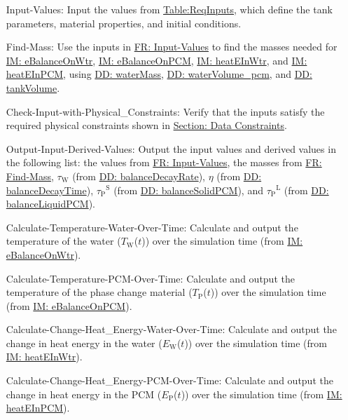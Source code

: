 \documentclass[12pt]{article}
\begin{document}
\begin{itemize}
\item[Input-Values:\phantomsection\label{inputValues}]{Input the values from \hyperref[Table:ReqInputs]{Table:ReqInputs}, which define the tank parameters, material properties, and initial conditions.}
\item[Find-Mass:\phantomsection\label{findMass}]{Use the inputs in \hyperref[inputValues]{FR: Input-Values} to find the masses needed for \hyperref[IM:eBalanceOnWtr]{IM: eBalanceOnWtr}, \hyperref[IM:eBalanceOnPCM]{IM: eBalanceOnPCM}, \hyperref[IM:heatEInWtr]{IM: heatEInWtr}, and \hyperref[IM:heatEInPCM]{IM: heatEInPCM}, using \hyperref[DD:waterMass]{DD: waterMass}, \hyperref[DD:waterVolume.pcm]{DD: waterVolume\_pcm}, and \hyperref[DD:tankVolume]{DD: tankVolume}.}
\item[Check-Input-with-Physical\_Constraints:\phantomsection\label{checkWithPhysConsts}]{Verify that the inputs satisfy the required physical constraints shown in \hyperref[Sec:DataConstraints]{Section: Data Constraints}.}
\item[Output-Input-Derived-Values:\phantomsection\label{outputInputDerivVals}]{Output the input values and derived values in the following list: the values from \hyperref[inputValues]{FR: Input-Values}, the masses from \hyperref[findMass]{FR: Find-Mass}, ${τ_{\text{W}}}$ (from \hyperref[DD:balanceDecayRate]{DD: balanceDecayRate}), $η$ (from \hyperref[DD:balanceDecayTime]{DD: balanceDecayTime}), ${{τ_{\text{P}}}^{\text{S}}}$ (from \hyperref[DD:balanceSolidPCM]{DD: balanceSolidPCM}), and ${{τ_{\text{P}}}^{\text{L}}}$ (from \hyperref[DD:balanceLiquidPCM]{DD: balanceLiquidPCM}).}
\item[Calculate-Temperature-Water-Over-Time:\phantomsection\label{calcTempWtrOverTime}]{Calculate and output the temperature of the water (${T_{\text{W}}}$($t$)) over the simulation time (from \hyperref[IM:eBalanceOnWtr]{IM: eBalanceOnWtr}).}
\item[Calculate-Temperature-PCM-Over-Time:\phantomsection\label{calcTempPCMOverTime}]{Calculate and output the temperature of the phase change material (${T_{\text{P}}}$($t$)) over the simulation time (from \hyperref[IM:eBalanceOnPCM]{IM: eBalanceOnPCM}).}
\item[Calculate-Change-Heat\_Energy-Water-Over-Time:\phantomsection\label{calcChgHeatEnergyWtrOverTime}]{Calculate and output the change in heat energy in the water (${E_{\text{W}}}$($t$)) over the simulation time (from \hyperref[IM:heatEInWtr]{IM: heatEInWtr}).}
\item[Calculate-Change-Heat\_Energy-PCM-Over-Time:\phantomsection\label{calcChgHeatEnergyPCMOverTime}]{Calculate and output the change in heat energy in the PCM (${E_{\text{P}}}$($t$)) over the simulation time (from \hyperref[IM:heatEInPCM]{IM: heatEInPCM}).}

\end{itemize}
\end{document}
